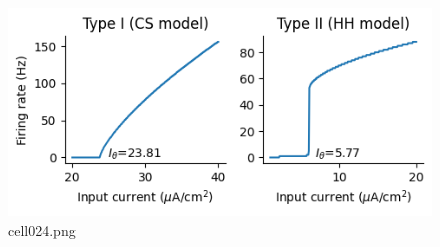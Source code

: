 \begin{figure}[ht]
	\centering
	\includegraphics[scale=0.8, max width=\linewidth]{./fig/neuron-model/hodgkin-huxley/cell024.png}
	\caption{cell024.png}
	\label{cell024.png}
\end{figure}